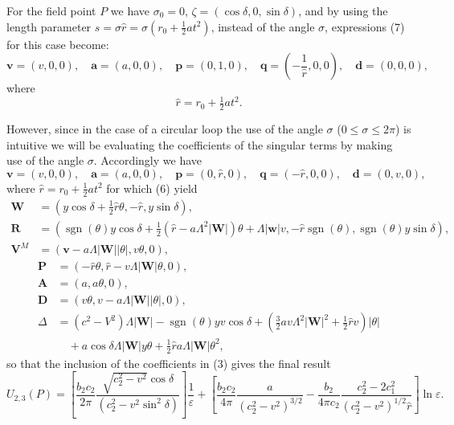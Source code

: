 \documentclass[12pt]{article}
\begin{document}
For the field point $P$ we have $\sigma_0=0$, $\zeta=(\cos\delta,0,\sin\delta)$, and by using the length parameter $s=\sigma\hat{r}=\sigma(r_0+\frac{1}{2}at^2)$, instead of the angle $\sigma$, expressions (7) for this case become:
\[
\mathbf{v}=(v,0,0), \quad \mathbf{a}=(a,0,0), \quad \mathbf{p}=(0,1,0), \quad \mathbf{q}=\left(-\frac{1}{\hat{r}},0,0\right), \quad \mathbf{d}=(0,0,0),
\]
where
\[
\hat{r} = r_0 + \tfrac{1}{2}at^2.
\]

However, since in the case of a circular loop the use of the angle $\sigma$ ($0\leqslant\sigma\leqslant 2\pi$) is intuitive we will be evaluating the coefficients of the singular terms by making use of the angle $\sigma$. Accordingly we have
\[
\mathbf{v}=(v,0,0), \quad \mathbf{a}=(a,0,0), \quad \mathbf{p}=(0,\hat{r},0), \quad \mathbf{q}=(-\hat{r},0,0), \quad \mathbf{d}=(0,v,0),
\]
where $\hat{r}=r_0+\frac{1}{2}at^2$ for which (6) yield
\begin{align*}
\mathbf{W} &= (y\cos\delta + \tfrac{1}{2}\hat{r}\theta, -\hat{r}, y\sin\delta), \\
\mathbf{R} &= (\operatorname{sgn}(\theta)y\cos\delta + \tfrac{1}{2}(\hat{r}-a\Lambda^2|\mathbf{W}|)\theta + \Lambda|\mathbf{w}|v, -\hat{r}\operatorname{sgn}(\theta), \operatorname{sgn}(\theta)y\sin\delta), \\
\mathbf{V}^M &= (\mathbf{v}-a\Lambda|\mathbf{W}||\theta|, v\theta, 0),
\end{align*}
\begin{align*}
\mathbf{P} &= (-\hat{r}\theta, \hat{r}-v\Lambda|\mathbf{W}|\theta, 0), \\
\mathbf{A} &= (a, a\theta, 0), \\
\mathbf{D} &= (v\theta, v-a\Lambda|\mathbf{W}||\theta|, 0), \\
\Delta &= (c^2-V^2)\Lambda|\mathbf{W}| - \operatorname{sgn}(\theta)yv\cos\delta + (\tfrac{3}{2}av\Lambda^2|\mathbf{W}|^2 + \tfrac{1}{2}\hat{r}v)|\theta| \\
&\quad + a\cos\delta\Lambda|\mathbf{W}|y\theta + \tfrac{1}{2}\hat{r}a\Lambda|\mathbf{W}|\theta^2,
\end{align*}
so that the inclusion of the coefficients in (3) gives the final result
\begin{equation}
U_{2,3}(P) = \left[\frac{b_2 c_2}{2\pi}\frac{\sqrt{c_2^2-v^2}\cos\delta}{(c_2^2-v^2\sin^2\delta)}\right]\frac{1}{\varepsilon} + \left[\frac{b_2 c_2}{4\pi}\frac{a}{(c_2^2-v^2)^{3/2}} - \frac{b_2}{4\pi c_2}\frac{c_2^2-2c_1^2}{(c_2^2-v^2)^{1/2}\hat{r}}\right]\ln\varepsilon.
\end{equation}
\end{document}
